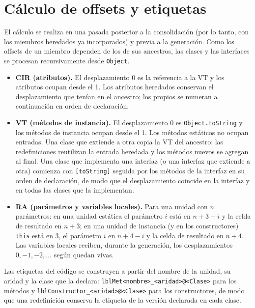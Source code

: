 \documentclass[11pt,a4paper]{article}
\begin{document}
\section{Cálculo de offsets y etiquetas}

El cálculo se realiza en una pasada posterior a la consolidación (por lo tanto,
con los miembros heredados ya incorporados) y previa a la generación. Como los
offsets de un miembro dependen de los de sus ancestros, las clases y las
interfaces se procesan recursivamente desde \texttt{Object}.

\begin{itemize}
  \item \textbf{CIR (atributos).} El desplazamiento 0 es la referencia a la VT y
        los atributos ocupan desde el 1. Los atributos heredados conservan el
        desplazamiento que tenían en el ancestro; los propios se numeran a
        continuación en orden de declaración.
  \item \textbf{VT (métodos de instancia).} El desplazamiento 0 es
        \texttt{Object.toString} y los métodos de instancia ocupan desde el 1. Los
        métodos estáticos no ocupan entradas. Una clase que extiende a otra copia
        la VT del ancestro: las redefiniciones reutilizan la entrada heredada y
        los métodos nuevos se agregan al final. Una clase que implementa una
        interfaz (o una interfaz que extiende a otra) comienza con
        \texttt{[toString]} seguida por los métodos de la interfaz en su orden de
        declaración, de modo que el desplazamiento coincide en la interfaz y en
        todas las clases que la implementan.
  \item \textbf{RA (parámetros y variables locales).} Para una unidad con $n$
        parámetros: en una unidad estática el parámetro $i$ está en $n+3-i$ y la
        celda de resultado en $n+3$; en una unidad de instancia (y en los
        constructores) \texttt{this} está en 3, el parámetro $i$ en $n+4-i$ y la
        celda de resultado en $n+4$. Las variables locales reciben, durante la
        generación, los desplazamientos $0,-1,-2,\dots$ según quedan vivas.
\end{itemize}

Las etiquetas del código se construyen a partir del nombre de la unidad, su
aridad y la clase que la declara: \texttt{lblMet<nombre>\_<aridad>@<Clase>} para
los métodos y \texttt{lblConstructor\_<aridad>@<Clase>} para los constructores,
de modo que una redefinición conserva la etiqueta de la versión declarada en cada
clase.
\end{document}
